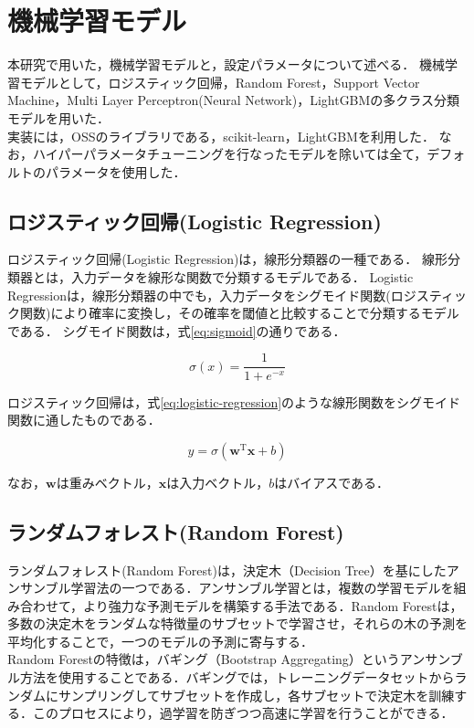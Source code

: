 \section{機械学習モデル}\label{sec:ml-model}

本研究で用いた，機械学習モデルと，設定パラメータについて述べる．
機械学習モデルとして，ロジスティック回帰，Random Forest，Support Vector Machine，Multi Layer Perceptron(Neural Network)，LightGBMの多クラス分類モデルを用いた．\\
実装には，OSSのライブラリである，scikit-learn\cite{scikit-learn}，LightGBM\cite{lightgbm}を利用した．
なお，ハイパーパラメータチューニングを行なったモデルを除いては全て，デフォルトのパラメータを使用した．

\subsection{ロジスティック回帰(Logistic Regression)}

ロジスティック回帰(Logistic Regression)は，線形分類器の一種である．
線形分類器とは，入力データを線形な関数で分類するモデルである．
Logistic Regressionは，線形分類器の中でも，入力データをシグモイド関数(ロジスティック関数)により確率に変換し，その確率を閾値と比較することで分類するモデルである．
シグモイド関数は，式\ref{eq:sigmoid}の通りである．

\begin{equation}
  \label{eq:sigmoid}
  \sigma(x) = \frac{1}{1 + e^{-x}}
\end{equation}

ロジスティック回帰は，式\ref{eq:logistic-regression}のような線形関数をシグモイド関数に通したものである．

\begin{equation}
  \label{eq:logistic-regression}
  y = \sigma\left(\boldsymbol{w}^{\mathrm{T}}\boldsymbol{x}+ b \right)
\end{equation}

なお，$\boldsymbol{w}$は重みベクトル，$\boldsymbol{x}$は入力ベクトル，$b$はバイアスである．

\subsection{ランダムフォレスト(Random Forest)}
ランダムフォレスト(Random Forest)は，決定木（Decision Tree）を基にしたアンサンブル学習法の一つである．アンサンブル学習とは，複数の学習モデルを組み合わせて，より強力な予測モデルを構築する手法である．Random Forestは，多数の決定木をランダムな特徴量のサブセットで学習させ，それらの木の予測を平均化することで，一つのモデルの予測に寄与する．\\
Random Forestの特徴は，バギング（Bootstrap Aggregating）というアンサンブル方法を使用することである．バギングでは，トレーニングデータセットからランダムにサンプリングしてサブセットを作成し，各サブセットで決定木を訓練する．このプロセスにより，過学習を防ぎつつ高速に学習を行うことができる．

